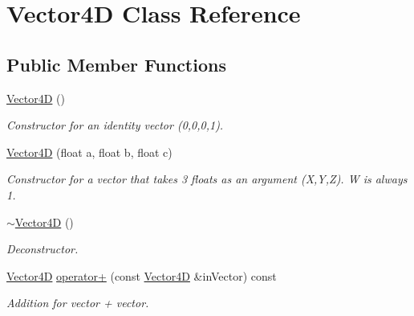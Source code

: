 \hypertarget{class_vector4_d}{}\section{Vector4D Class Reference}
\label{class_vector4_d}
\subsection*{Public Member Functions}
\begin{DoxyCompactItemize}
\item 
\mbox{\label{class_vector4_d_a097dbad3d594f84c02857ea4b63c8186}} 
\mbox{\hyperlink{class_vector4_d_a097dbad3d594f84c02857ea4b63c8186}{Vector4D}} ()
\begin{DoxyCompactList}\small\item\em Constructor for an identity vector (0,0,0,1). \end{DoxyCompactList}\item 
\mbox{\label{class_vector4_d_a5709fd6fc81bb4f7b4da05b1d8ee9dd3}} 
\mbox{\hyperlink{class_vector4_d_a5709fd6fc81bb4f7b4da05b1d8ee9dd3}{Vector4D}} (float a, float b, float c)
\begin{DoxyCompactList}\small\item\em Constructor for a vector that takes 3 floats as an argument (X,Y,Z). W is always 1. \end{DoxyCompactList}\item 
\mbox{\label{class_vector4_d_a273478ee200d57eaf8c140a25b4d74e5}} 
\mbox{\hyperlink{class_vector4_d_a273478ee200d57eaf8c140a25b4d74e5}{$\sim$\+Vector4D}} ()
\begin{DoxyCompactList}\small\item\em Deconstructor. \end{DoxyCompactList}\item 
\mbox{\label{class_vector4_d_af063d011406798b6bb05de1934506d58}} 
\mbox{\hyperlink{class_vector4_d}{Vector4D}} \mbox{\hyperlink{class_vector4_d_af063d011406798b6bb05de1934506d58}{operator+}} (const \mbox{\hyperlink{class_vector4_d}{Vector4D}} \&in\+Vector) const
\begin{DoxyCompactList}\small\item\em Addition for vector + vector. \end{DoxyCompactList}\item 

\end{DoxyCompactItemize}
